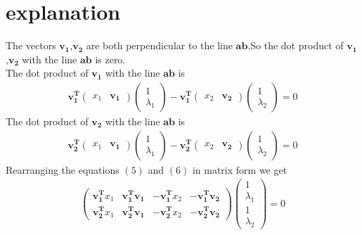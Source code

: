\documentclass[journal,12pt,twocolumn]{IEEEtran}
\begin{document}
\section{explanation}
The vectors $\bm{v_1}$,$\bm{v_2}$ are both perpendicular to the line $\bm{ab}$.So the dot product of $\bm{v_1}$,$\bm{v_2}$ with the line $\bm{ab}$ is zero.\\
The dot product of $\bm{v_1}$ with the line $\bm{ab}$ is
\begin{align}
    \bm{v_1^T}\begin{pmatrix}x_1 & \bm{v_1}\end{pmatrix}\begin{pmatrix}1 \\ \lambda_1\end{pmatrix}-\bm{v_1^T}\begin{pmatrix}x_2 & \bm{v_2}\end{pmatrix}\begin{pmatrix}1 \\ \lambda_2\end{pmatrix}=0
\end{align}
The dot product of $\bm{v_2}$ with the line $\bm{ab}$ is\\
\begin{align}
    \bm{v_2^T}\begin{pmatrix}x_1 & \bm{v_1}\end{pmatrix}\begin{pmatrix}1 \\ \lambda_1\end{pmatrix}-\bm{v_2^T}\begin{pmatrix}x_2 & \bm{v_2}\end{pmatrix}\begin{pmatrix}1 \\ \lambda_2\end{pmatrix}=0
\end{align}
Rearranging the equations $(5)$ and $(6)$ in matrix form we get\\
\begin{align}
    \begin{pmatrix}\bm{v_1^T}x_1 & \bm{v_1^T}\bm{v_1} & -\bm{v_1^T}x_2 & -\bm{v_1^T}\bm{v_2}\\\bm{v_2^T}x_1 & \bm{v_2^T}\bm{v_1} & -\bm{v_2^T}x_2 & -\bm{v_2^T}\bm{v_2}\end{pmatrix}\begin{pmatrix}1\\\lambda_1\\1\\\lambda_2\end{pmatrix}=0
\end{align}
\end{document}
